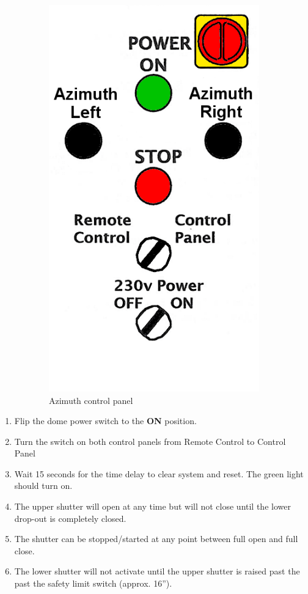 \documentclass[12pt,titlepage]{article}
\begin{document}
\begin{figure}[H]
\begin{subfigure}[t]{0.4\textwidth}
        \centering
        \includegraphics[width=.8\textwidth]{./images/dome/azimuth_ctrl_panel.png}
        \caption{Azimuth control panel}
    \end{subfigure}
    \caption{}
\end{figure}

\begin{enumerate}
	\item Flip the dome power switch to the \textbf{ON} position.
	\item Turn the switch on both control panels from Remote Control to Control Panel
	\item Wait 15 seconds for the time delay to clear system and reset. The green light should turn on.
	\item The upper shutter will open at any time but will not close until the lower drop-out is completely closed.
	\item The shutter can be stopped/started at any point between full open and full close.
	\item The lower shutter will not activate until the upper shutter is raised past the past the safety limit switch (approx. 16'').
\end{enumerate}
\end{document}
